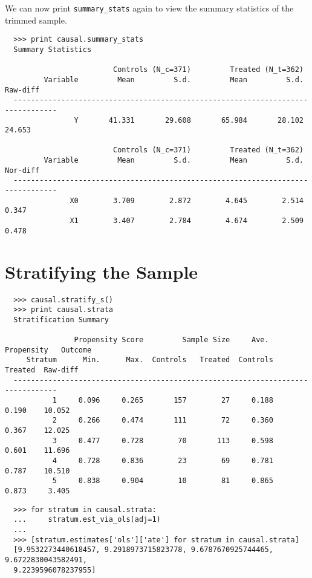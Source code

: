 \documentclass[12pt]{article}
\theoremstyle{definition}
\theoremstyle{definition}
\theoremstyle{definition}
\theoremstyle{remark}
\begin{document}
We can now print \texttt{summary\_stats} again to view the summary statistics of the trimmed sample.

\begin{verbatim}
  >>> print causal.summary_stats
  Summary Statistics
  
                         Controls (N_c=371)         Treated (N_t=362)             
         Variable         Mean         S.d.         Mean         S.d.     Raw-diff
  --------------------------------------------------------------------------------
                Y       41.331       29.608       65.984       28.102       24.653
  
                         Controls (N_c=371)         Treated (N_t=362)             
         Variable         Mean         S.d.         Mean         S.d.     Nor-diff
  --------------------------------------------------------------------------------
               X0        3.709        2.872        4.645        2.514        0.347
               X1        3.407        2.784        4.674        2.509        0.478
\end{verbatim}

\section*{Stratifying the Sample}

\begin{verbatim}
  >>> causal.stratify_s()
  >>> print causal.strata
  Stratification Summary
  
                Propensity Score         Sample Size     Ave. Propensity   Outcome
     Stratum      Min.      Max.  Controls   Treated  Controls   Treated  Raw-diff
  --------------------------------------------------------------------------------
           1     0.096     0.265       157        27     0.188     0.190    10.052
           2     0.266     0.474       111        72     0.360     0.367    12.025
           3     0.477     0.728        70       113     0.598     0.601    11.696
           4     0.728     0.836        23        69     0.781     0.787    10.510
           5     0.838     0.904        10        81     0.865     0.873     3.405
\end{verbatim}

\begin{verbatim}
  >>> for stratum in causal.strata:
  ...     stratum.est_via_ols(adj=1)
  ... 
  >>> [stratum.estimates['ols']['ate'] for stratum in causal.strata]
  [9.9532273440618457, 9.2918973715823778, 9.6787670925744465, 9.6722830043582491,
  9.2239596078237955]
\end{verbatim}
\end{document}
